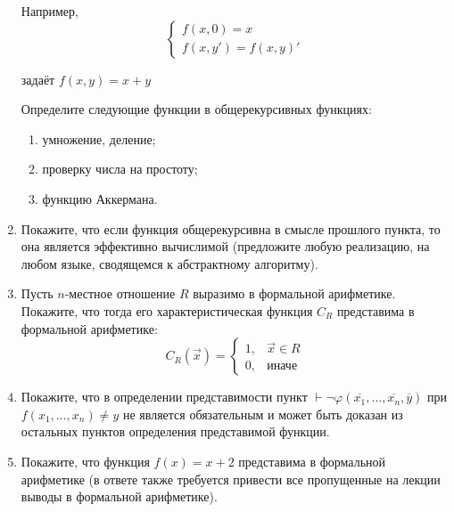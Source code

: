 \documentclass[10pt,a4paper,oneside]{article}
\begin{document}
\begin{enumerate}
Например, 
$$\left\{\begin{array}{l}f(x,0) = x\\f(x,y') = f(x,y)'\end{array}\right.$$

задаёт $f(x,y) = x+y$

Определите следующие функции в общерекурсивных функциях:
\begin{enumerate}
\item умножение, деление;
\item проверку числа на простоту;
\item функцию Аккермана.
\end{enumerate}

\item Покажите, что если функция общерекурсивна в смысле прошлого пункта, то она является эффективно вычислимой (предложите
любую реализацию, на любом языке, сводящемся к абстрактному алгоритму).

\item Пусть $n$-местное отношение $R$ выразимо в формальной арифметике. Покажите, что
тогда его характеристическая функция $C_R$ представима в формальной арифметике:
$$C_R(\overrightarrow{x}) = \left\{\begin{array}{ll}1,& \overrightarrow{x}\in R\\0, &\text{иначе}\end{array}\right.$$

\item Покажите, что в определении представимости пункт
$\vdash\neg\varphi(\overline{x_1},\dots,\overline{x_n},\overline{y})$ при $f(x_1,\dots,x_n) \ne y$ не является
обязательным и может быть доказан из остальных пунктов определения представимой функции.

\item Покажите, что функция $f(x) = x+2$ представима в формальной арифметике (в ответе также требуется привести все пропущенные
на лекции выводы в формальной арифметике).
\end{enumerate}
\end{document}
